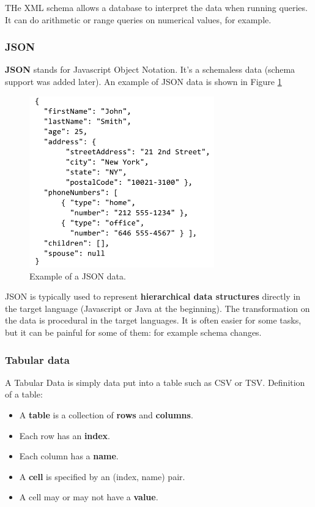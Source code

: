 THe XML schema allows a database to interpret the data when running queries. It can do arithmetic or range queries on numerical values, for example.

\subsubsection{JSON}

{\bf JSON} stands for Javascript Object Notation. It's a schemaless data (schema support was added later). An example of JSON data is shown in Figure \ref{pic:json}

\begin{figure}[H]%
 \centering
 \includegraphics[width=8cm]{./pic/json}
 \caption{\label{pic:json} Example of a JSON data.}
\end{figure}

JSON is typically used to represent {\bf hierarchical data structures} directly in the target language (Javascript or Java at the beginning). The transformation on the data is procedural in the target languages. It is often easier for some tasks, but it can be painful for some of them: for example schema changes.

\subsubsection{Tabular data}

A Tabular Data is simply data put into a table such as CSV or TSV. Definition of a table:
\begin{itemize}
 \item A {\bf table} is a collection of {\bf rows} and {\bf columns}.
 \item Each row has an {\bf index}.
 \item Each column has a {\bf name}.
 \item A {\bf cell} is specified by an (index, name) pair.
 \item A cell may or may not have a {\bf value}.
\end{itemize}


